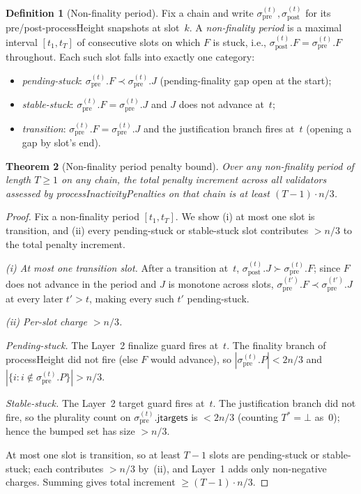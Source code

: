 \ifx\litemode\undefined\documentclass{article}\fi
\newcommand{\jtargets}{\mathsf{jtargets}}
\newcommand{\processHeight}{\textsf{processHeight}\xspace}
\newcommand{\processInactivityPenalties}{\textsf{processInactivityPenalties}\xspace}
\theoremstyle{plain}
\newtheorem{theorem}{Theorem}
\theoremstyle{definition}
\newtheorem{definition}[theorem]{Definition}
\theoremstyle{remark}
\begin{document}
\begin{definition}[Non-finality period]\label{def:non-finality-period}
Fix a chain and write $\sigma_{\mathrm{pre}}^{(t)}, \sigma_{\mathrm{post}}^{(t)}$ for its pre/post-\processHeight snapshots at slot~$k$.
A \emph{non-finality period} is a maximal interval $[t_1, t_T]$ of consecutive slots on which $F$ is stuck, i.e., $\sigma_{\mathrm{post}}^{(t)}.F = \sigma_{\mathrm{pre}}^{(t)}.F$ throughout.
Each such slot falls into exactly one category:
\begin{itemize}
  \item \emph{pending-stuck}: $\sigma_{\mathrm{pre}}^{(t)}.F \prec \sigma_{\mathrm{pre}}^{(t)}.J$ (pending-finality gap open at the start);
  \item \emph{stable-stuck}: $\sigma_{\mathrm{pre}}^{(t)}.F = \sigma_{\mathrm{pre}}^{(t)}.J$ and $J$ does not advance at~$t$;
  \item \emph{transition}: $\sigma_{\mathrm{pre}}^{(t)}.F = \sigma_{\mathrm{pre}}^{(t)}.J$ and the justification branch fires at~$t$ (opening a gap by slot's end).
\end{itemize}
\end{definition}

\begin{theorem}[Non-finality period penalty bound]\label{thm:tightness}
Over any non-finality period of length $T \geq 1$ on any chain, the total penalty increment across all validators assessed by \processInactivityPenalties on that chain is at least $(T - 1) \cdot n/3$.
\end{theorem}

\begin{proof}
Fix a non-finality period $[t_1, t_T]$.
We show (i) at most one slot is transition, and (ii) every pending-stuck or stable-stuck slot contributes $> n/3$ to the total penalty increment.

\emph{(i) At most one transition slot.}
After a transition at~$t$, $\sigma_{\mathrm{post}}^{(t)}.J \succ \sigma_{\mathrm{pre}}^{(t)}.F$; since $F$ does not advance in the period and $J$ is monotone across slots, $\sigma_{\mathrm{pre}}^{(t')}.F \prec \sigma_{\mathrm{pre}}^{(t')}.J$ at every later $t' > t$, making every such $t'$ pending-stuck.

\emph{(ii) Per-slot charge $> n/3$.}

\emph{Pending-stuck.} The Layer~2 finalize guard fires at~$t$.
The finality branch of \processHeight did not fire (else $F$ would advance), so $|\sigma_{\mathrm{pre}}^{(t)}.P| < 2n/3$ and $|\{i : i \notin \sigma_{\mathrm{pre}}^{(t)}.P\}| > n/3$.

\emph{Stable-stuck.} The Layer~2 target guard fires at~$t$.
The justification branch did not fire, so the plurality count on $\sigma_{\mathrm{pre}}^{(t)}.\jtargets$ is $< 2n/3$ (counting $T^* = \bot$ as~$0$); hence the bumped set has size $> n/3$.

At most one slot is transition, so at least $T - 1$ slots are pending-stuck or stable-stuck; each contributes $> n/3$ by~(ii), and Layer~1 adds only non-negative charges.
Summing gives total increment $\geq (T-1) \cdot n/3$.
\end{proof}
\end{document}

